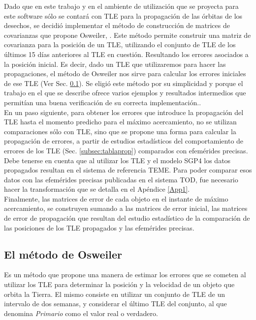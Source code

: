 Dado que en este trabajo y en el ambiente de utilizaci\'on que se proyecta para este software s\'olo se contar\'a con TLE para la propagaci\'on de las \'orbitas de los desechos, se decidi\'o implementar el m\'etodo de construcci\'on de matrices de covarianzas que propone Osweiler, \citep{osweiler}. Este m\'etodo permite construir una matriz de covarianza para la posici\'on de un TLE, utilizando el conjunto de TLE de los \'ultimos 15 d\'ias anteriores al TLE en cuesti\'on. Resultando los errores asociados a la posici\'on inicial. Es decir, dado un TLE que utilizaremos para hacer las propagaciones, el m\'etodo de Osweiler nos sirve para calcular los errores iniciales de ese TLE (Ver Sec. \ref{subsec:osw}). Se eligi\'o este m\'etodo por su simplicidad y porque el trabajo en el que se describe ofrece varios ejemplos y resultados intermedios que permit\'ian una buena verificaci\'on de su correcta implementaci\'on..\\

En un paso siguiente, para obtener los errores que introduce la propagaci\'on del TLE hasta el momento predicho para el m\'aximo acercamiento, no se utilizan comparaciones s\'olo con TLE, sino que se propone una forma para calcular la propagaci\'on de errores, a partir de estudios estad\'isticos del comportamiento de errores de los TLE (Sec. \ref{subsec:tablaprop}) comparados con efem\'erides precisas.\\
Debe tenerse en cuenta que al utilizar los TLE y el modelo SGP4  los datos propagados resultan en el sistema de referencia \ac{TEME}. Para poder comparar esos datos con las efem\'erides precisas publicadas en el sistema TOD, fue necesario hacer la transformaci\'on que se detalla en el Ap\'endice \ref{App1}.\\

Finalmente, las matrices de error de cada objeto en el instante de m\'aximo acercamiento, se construyen sumando a las matrices de error inicial, las matrices de error de propagaci\'on que resultan del estudio estad\'istico de la comparaci\'on de las posiciones de los TLE propagados y las efem\'erides precisas.

\subsection{ El m\'etodo de Osweiler}\label{subsec:osw}
Es un m\'etodo que propone una manera de estimar los errores que se cometen al utilizar los TLE para determinar la posici\'on y la velocidad de un objeto que orbita la Tierra.
El mismo consiste en utilizar un conjunto de TLE de un intervalo de dos semanas, y considerar el \'ultimo TLE del conjunto, al que denomina {\it{Primario}} como el valor real o verdadero.\\

